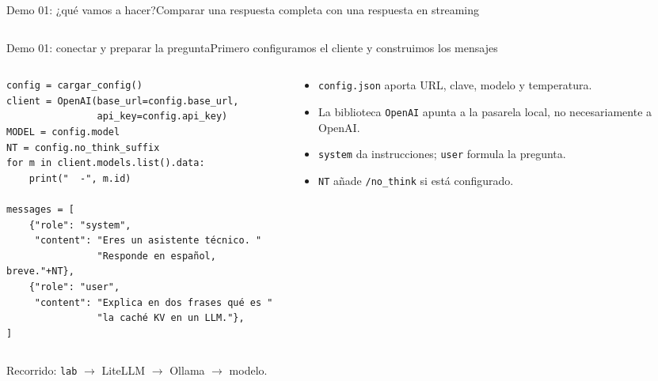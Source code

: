 \begin{frame}{Demo 01: ¿qué vamos a hacer?}{Comparar una respuesta completa con una respuesta en streaming}
	\begin{columns}[T]
		\begin{column}{0.31\textwidth}
		\end{column}
		\begin{column}{0.31\textwidth}
		\end{column}
		\begin{column}{0.31\textwidth}
		\end{column}
	\end{columns}
\end{frame}

\begin{frame}[fragile]{Demo 01: conectar y preparar la pregunta}{Primero configuramos el cliente y construimos los mensajes}
	\begin{columns}[T]
		\begin{column}{0.58\textwidth}
			\begin{lstlisting}
config = cargar_config()
client = OpenAI(base_url=config.base_url,
                api_key=config.api_key)
MODEL = config.model
NT = config.no_think_suffix
for m in client.models.list().data:
    print("  -", m.id)

messages = [
    {"role": "system",
     "content": "Eres un asistente técnico. "
                "Responde en español, breve."+NT},
    {"role": "user",
     "content": "Explica en dos frases qué es "
                "la caché KV en un LLM."},
]
\end{lstlisting}
		\end{column}
		\begin{column}{0.4\textwidth}
			\footnotesize
			\begin{itemize}
				\item \texttt{config.json} aporta URL, clave, modelo y temperatura.
				\item La biblioteca \texttt{OpenAI} apunta a la pasarela local, no necesariamente a OpenAI.
				\item \texttt{system} da instrucciones; \texttt{user} formula la pregunta.
				\item \texttt{NT} añade \texttt{/no\_think} si está configurado.
			\end{itemize}
		\end{column}
	\end{columns}
	{\footnotesize Recorrido: \texttt{lab} $\rightarrow$ LiteLLM $\rightarrow$ Ollama $\rightarrow$ modelo.}
\end{frame}

